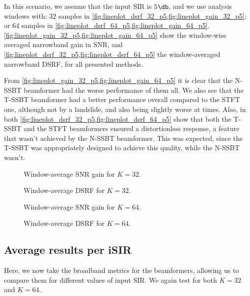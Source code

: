 In this scenario, we assume that the input SIR is $5\dB$, and we use analysis windows with: 32 samples in \cref{fig:lineplot_dsrf_32_p5,fig:lineplot_gain_32_p5}; or 64 samples in \cref{fig:lineplot_dsrf_64_p5,fig:lineplot_gain_64_p5}. \cref{fig:lineplot_gain_32_p5,fig:lineplot_gain_64_p5} show the window-wise averaged narrowband gain in SNR, and \cref{fig:lineplot_dsrf_32_p5,fig:lineplot_dsrf_64_p5} the window-averaged narrowband DSRF, for all presented methods.

From \cref{fig:lineplot_gain_32_p5,fig:lineplot_gain_64_p5} it is clear that the N-SSBT beamformer had the worse performance of them all. We also see that the T-SSBT beamformer had a better performance overall compared to the STFT one, although not by a landslide, and also being slightly worse at times. Also, in both \cref{fig:lineplot_dsrf_32_p5,fig:lineplot_dsrf_64_p5} show that both the T-SSBT and the STFT beamformers ensured a distortionless response, a feature that wasn't achieved by the N-SSBT beamformer. This was expected, since the T-SSBT was appropriately designed to achieve this quality, while the N-SSBT wasn't.


\begin{figure}[H]
\centering

\caption{Window-average SNR gain for $K = 32$.}
\label{fig:lineplot_gain_32_p5}
\end{figure}
\begin{figure}[H]
	\centering
	
	\caption{Window-average DSRF for $K = 32$.}
	\label{fig:lineplot_dsrf_32_p5}
\end{figure}


\begin{figure}[H]
\centering

\caption{Window-average SNR gain for $K = 64$.}
\label{fig:lineplot_gain_64_p5}
\end{figure}
\begin{figure}[H]
	\centering
	
	\caption{Window-average DSRF for $K = 64$.}
	\label{fig:lineplot_dsrf_64_p5}
\end{figure}

\subsection{Average results per iSIR}

Here, we now take the broadband metrics for the beamformers, allowing us to compare them for different values of input SIR. We again test for both $K = 32$ and $K = 64$.

